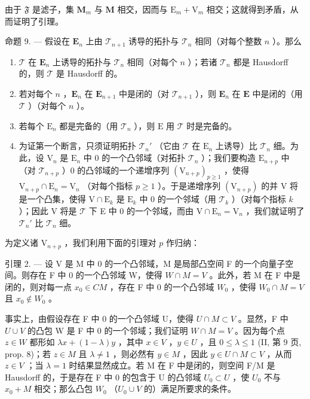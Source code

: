 由于 \(\mathfrak{F}\) 是滤子，集 \(\mathbf{M}_m\) 与 \(\mathbf{M}\) 相交，因而与 \(\mathrm{E}_m + \mathrm{V}_m\) 相交；这就得到矛盾，从而证明了引理。

命题 9. --- 假设在 \(\mathbf{E}_n\) 上由 \(\mathcal{T}_{n+1}\) 诱导的拓扑与 \(\mathcal{T}_n\) 相同（对每个整数 \(n\) ）。那么

\begin{enumerate}
\def\labelenumi{(\roman{enumi})}
\item
  \(\mathcal{T}\) 在 \(\mathbf{E}_n\) 上诱导的拓扑与 \(\mathcal{T}_n\) 相同（对每个 \(n\) ）；若诸 \(\mathcal{T}_n\) 都是 Hausdorff 的，则 \(\mathcal{T}\) 是 Hausdorff 的。
\item
  若对每个 \(n\) ，\(\mathbf{E}_n\) 在 \(\mathbf{E}_{n+1}\) 中是闭的（对 \(\mathcal{T}_{n+1}\) ），则 \(\mathbf{E}_n\) 在 \(\mathbf{E}\) 中是闭的（用 \(\mathcal{T}\) ）（对每个 \(n\) ）。
\item
  若每个 \(\mathrm{E}_n\) 都是完备的（用 \(\mathcal{T}_n\) ），则 \(\mathrm{E}\) 用 \(\mathcal{T}\) 时是完备的。
\item
  为证第一个断言，只须证明拓扑 \(\mathcal{T}_n'\) （它由 \(\mathcal{T}\) 在 \(\mathrm{E}_n\) 上诱导）比 \(\mathcal{T}_n\) 细。为此，设 \(\mathrm{V}_n\) 是 \(\mathrm{E}_n\) 中 0 的一个凸邻域（对拓扑 \(\mathcal{T}_n\) ）；我们要构造 \(\mathrm{E}_{n+p}\) 中（对 \(\mathcal{T}_{n+p}\) ）0 的凸邻域的一个递增序列 \((\mathrm{V}_{n+p})_{p\geqslant 1}\) ，使得 \(\mathrm{V}_{n+p} \cap \mathrm{E}_n = \mathrm{V}_n\) （对每个指标 \(p \geqslant 1\) ）。于是递增序列 \((\mathrm{V}_{n+p})\) 的并 V 将是一个凸集，使得 \(\mathrm{V} \cap \mathrm{E}_k\) 是 \(\mathrm{E}_k\) 中 0 的一个邻域（用 \(\mathcal{T}_k\) ）（对每个指标 \(k\) ）；因此 V 将是 \(\mathcal{T}\) 下 E 中 0 的一个邻域，而由 \(\mathrm{V} \cap \mathrm{E}_n = \mathrm{V}_n\) ，我们就证明了 \(\mathcal{T}_n'\) 比 \(\mathcal{T}_n\) 细。
\end{enumerate}

为定义诸 \(\mathrm{V}_{n + p}\) ，我们利用下面的引理对 \(p\) 作归纳：

引理 2. --- 设 V 是 M 中 0 的一个凸邻域，M 是局部凸空间 F 的一个向量子空间。则存在 F 中 0 的一个凸邻域 W，使得 \(W \cap M = V\) 。此外，若 M 在 F 中是闭的，则对每一点 \(x_{0} \in C M\) ，存在 F 中 0 的一个凸邻域 \(W_{0}\) ，使得 \(W_{0} \cap M = V\) 且 \(x_{0} \notin W_{0}\) 。

事实上，由假设存在 F 中 0 的一个凸邻域 U，使得 \(U \cap M \subset V\) 。显然，F 中 \(U \cup V\) 的凸包 W 是 F 中 0 的一个邻域；我们证明 \(W \cap M = V\) 。因为每个点 \(z \in W\) 都形如 \(\lambda x + (1 - \lambda)y\) ，其中 \(x \in V\) ，\(y \in U\) ，且 \(0 \leqslant \lambda \leqslant 1\) (II, 第 9 页, prop. 8)；若 \(z \in M\) 且 \(\lambda \neq 1\) ，则必然有 \(y \in M\) ，因此 \(y \in U \cap M \subset V\) ，从而 \(z \in V\) ；当 \(\lambda = 1\) 时结果显然成立。若 M 在 F 中是闭的，则空间 F/M 是 Hausdorff 的，于是存在 F 中 0 的包含于 U 的凸邻域 \(U_0 \subset U\) ，使 \(U_0\) 不与 \(x_0 + M\) 相交；那么凸包 \(W_0\) （\(U_0 \cup V\) 的）满足所要求的条件。

